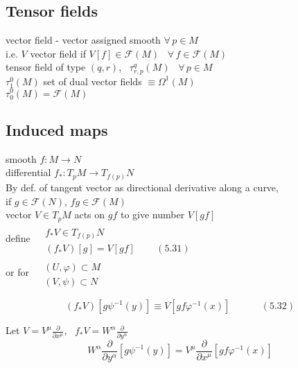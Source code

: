 \documentclass{book}
\begin{document}
\subsection{Tensor fields}

vector field - vector assigned smooth $\forall \, p \in M$ \\
\quad i.e. $V$ vector field if $V[f] \in \mathcal{F}(M)$ \quad \, $\forall \, f \in \mathcal{F}(M)$ \\

tensor field of type $(q,r)$, \, $\tau^q_{r,p}(M)$ \, $\forall \, p \in M$ \\
$\tau_1^0(M)$ set of dual vector fields $\equiv \Omega^1(M)$ \\
$\tau_0^0(M) = \mathcal{F}(M)$

\subsection{ Induced maps}

smooth $f:M \to N$ \\

differential $f_*:T_pM \to T_{f(p)}N$ \\
By def. of tangent vector as directional derivative along a curve, \\
\quad if $g \in \mathcal{F}(N)$, $fg \in \mathcal{F}(M)$ \\
vector $V \in T_pM$ acts on $gf$ to give number $V[gf]$ \\

define $\begin{aligned} & \quad \\
  & f_* V \in T_{f(p)}N  \\
  & (f_*V)[g] = V[gf] \quad \quad \, (5.31) \end{aligned}$ \\

or for $\begin{aligned} & \quad \\ 
  & (U,\varphi) \subset M \\ 
  & (V, \psi) \subset N \end{aligned}$ 

\[
(f_*V)[g\psi^{-1}(y) ] \equiv V[gf\varphi^{-1}(x) ] \quad \quad \quad \, (5.32)
\]

Let $V = V^{\mu} \frac{ \partial }{ \partial x^{\mu} }$, \, $f_* V = W^{\alpha} \frac{ \partial }{ \partial y^{\alpha} }$
\[
W^{\alpha} \frac{ \partial }{ \partial y^{\alpha} } [ g\psi^{-1}(y) ] = V^{\mu} \frac{ \partial }{ \partial x^{\mu} }[gf\varphi^{-1}(x) ]
\]
\end{document}
